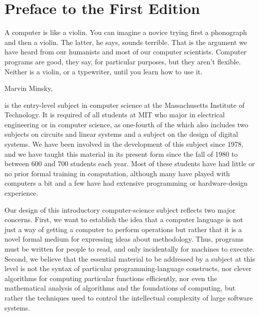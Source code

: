 
\chapter[chap:preface1]{Preface to the First Edition}

A computer is like a violin.
You can imagine a novice trying first a phonograph and then a violin.
The latter, he says, sounds terrible.
That is the argument we have heard from our humanists and most of our computer scientists.
Computer programs are good, they say, for particular purposes, but they aren't flexible.
Neither is a violin, or a typewriter, until you learn how to use it.

Marvin Minsky,

is the entry-level subject in computer science at the Massachusetts Institute of Technology.
It is required of all students at MIT who major in electrical engineering or in computer science,
as one-fourth of the 
which also includes two subjects on circuits and linear systems and a subject on the design of digital systems.
We have been involved in the development of this subject since 1978,
and we have taught this material in its present form since the fall of 1980 to between 600 and 700 students each year.
Most of these students have had little or no prior formal training in computation,
although many have played with computers a bit and a few have had extensive programming or hardware-design experience.

Our design of this introductory computer-science subject reflects two major concerns.
First,
we want to establish the idea that
a computer language is not just a way of getting a computer to perform operations
but rather that it is a novel formal medium for expressing ideas about methodology.
Thus, programs must be written for people to read, and only incidentally for machines to execute.
Second,
we believe that the essential material to be addressed by a subject at this level
is not the syntax of particular programming-language constructs,
nor clever algorithms for computing particular functions efficiently,
nor even the mathematical analysis of algorithms and the foundations of computing,
but rather the techniques used to control the intellectual complexity of large software systems.

